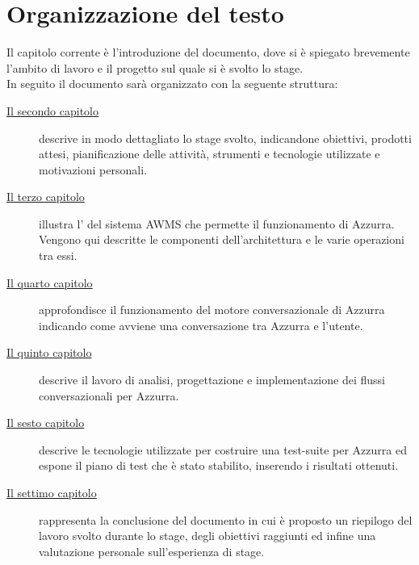 \section{Organizzazione del testo}
Il capitolo corrente è l'introduzione del documento, dove si è spiegato brevemente l'ambito di lavoro e il progetto sul quale si è svolto lo stage.\\
In seguito il documento sarà organizzato con la seguente struttura:
\begin{description}
    
    \item[{\hyperref[cap:descrizione-stage]{Il secondo capitolo}}] descrive in modo dettagliato lo stage svolto, indicandone obiettivi, prodotti attesi, pianificazione delle attività, strumenti e tecnologie utilizzate e motivazioni personali.
    
    \item[{\hyperref[cap:archittettura del sistema AWMS]{Il terzo capitolo}}] illustra l' del sistema \gls{AWMS} che permette il funzionamento di Azzurra. Vengono qui descritte le componenti dell'architettura e le varie operazioni tra essi.
    
    \item[{\hyperref[cap:flow engine]{Il quarto capitolo}}] approfondisce il funzionamento del motore conversazionale di Azzurra indicando come avviene una conversazione tra Azzurra e l'utente.
    
    \item[{\hyperref[cap:flussi di conversazione]{Il quinto capitolo}}] descrive il lavoro di analisi, progettazione e implementazione dei flussi conversazionali per Azzurra.
    
    \item[{\hyperref[cap:test]{Il sesto capitolo}}] descrive le tecnologie utilizzate per costruire una test-suite per Azzurra ed espone il piano di test che è stato stabilito, inserendo i risultati ottenuti.
    
    \item[{\hyperref[cap:conclusioni]{Il settimo capitolo}}] rappresenta la conclusione del documento in cui è proposto un riepilogo del lavoro svolto durante lo stage, degli obiettivi raggiunti ed infine una valutazione personale sull'esperienza di stage.
\end{description}
